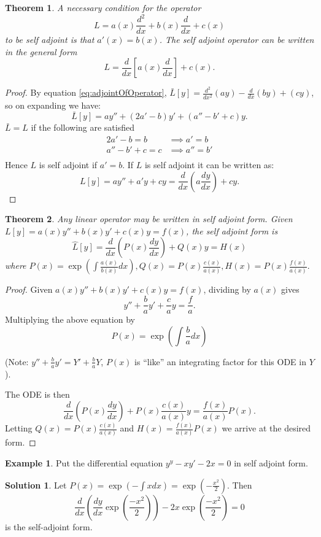 \documentclass{article}
\theoremstyle{plain}
\newtheorem{thm}{Theorem}[section]
\theoremstyle{definition}
\newtheorem{exmp}{Example}[section]
\newtheorem*{sol}{Solution}
\numberwithin{equation}{section}
\begin{document}
\begin{thm}
    A necessary condition for the operator
    \[ L = a(x) \frac{d^2}{dx} + b(x) \frac{d}{dx} + c(x) \]
    to be self adjoint is that $a'(x) = b(x)$. The self adjoint operator can be written in the general form
    \[ L = \frac{d}{dx} \left[ a(x) \frac{d}{dx} \right] + c(x) .\]
\end{thm}
\begin{proof}
    By equation \eqref{eq:adjointOfOperator}, $\bar{L}[y] = \frac{d^2}{dx^2} (ay) - \frac{d}{dx}(by) + (cy)$, so on expanding we have:
    \[ \bar{L}[y] = ay'' + (2a'-b)y' + (a''-b'+c)y.\]
    $\bar{L}=L$ if the following are satisfied
    \begin{align*}
        2a'-b = b &\implies a' = b \\
        a'' - b' + c = c &\implies a'' = b' \\
    \end{align*}
    Hence $L$ is self adjoint if $a'=b$. If $L$ is self adjoint it can be written as:
    \[ L[y] = ay'' + a'y + cy = \frac{d}{dx} \left( a\frac{dy}{dx} \right) + cy. \]
\end{proof}

\begin{thm}\label{thm:writeOperatorSelfAdjoin}
    Any linear operator may be written in self adjoint form. Given $L[y] = a(x)y'' + b(x)y' + c(x)y = f(x)$, the self adjoint form is 
    \[\hat{L}[y] = \frac{d}{dx}\left(P(x) \frac{dy}{dx} \right) + Q(x)y = H(x)\]
    where $P(x) = \exp\left(\int \frac{a(x)}{b(x)} dx \right), Q(x) = P(x)\frac{c(x)}{a(x)}, H(x)=P(x)\frac{f(x)}{a(x)}.$
\end{thm}

\begin{proof}
    Given $a(x)y'' + b(x)y' + c(x)y = f(x)$, dividing by $a(x)$ gives
    \[ y'' + \frac{b}{a} y' + \frac{c}{a}y = \frac{f}{a}. \]
    Multiplying the above equation by
    \[ P(x) = \exp\left(\int \frac{b}{a} dx \right) \]

    (Note: $y'' + \frac{b}{a}y' = Y' + \frac{b}{a}Y$, $P(x)$ is ``like'' an integrating factor for this ODE in $Y$).

    The ODE is then
    \[ \frac{d}{dx} \left(P(x)\frac{dy}{dx} \right) + P(x)\frac{c(x)}{a(x)}y  = \frac{f(x)}{a(x)}P(x).\]
    Letting $Q(x) = P(x)\frac{c(x)}{a(x)}$ and $H(x)=\frac{f(x)}{a(x)}P(x)$ we arrive at the desired form.
\end{proof}

\begin{tcolorbox}
    \begin{exmp}
        Put the differential equation $y^y - xy' -2x=0$ in self adjoint form.
    \end{exmp}
    \begin{sol}
        Let $P(x) = \exp\left(-\int x dx\right) = \exp(-\frac{x^2}{2}).$ Then
        \[ \frac{d}{dx}\left( \frac{dy}{dx} \exp\left(\frac{-x^2}{2}\right) \right) - 2x\exp\left(\frac{-x^2}{2}\right) = 0\]
        is the self-adjoint form.
    \end{sol}
\end{tcolorbox}
\end{document}
